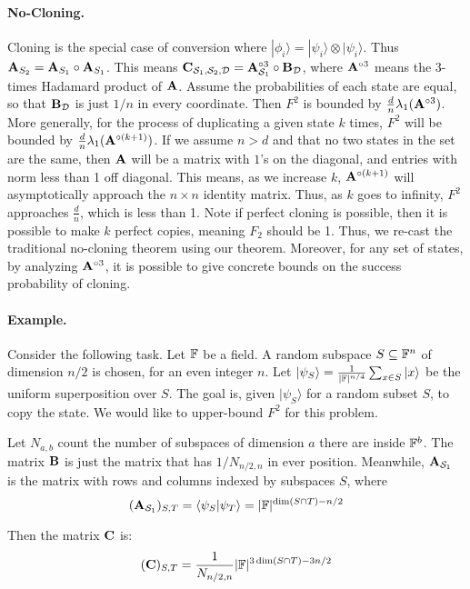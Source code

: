 \paragraph{No-Cloning.} Cloning is the special case of conversion where $|\phi_i\rangle=|\psi_i\rangle\otimes|\psi_i\rangle$.  Thus ${\mathbf{A}}_{S_2}={\mathbf{A}}_{S_1}\circ{\mathbf{A}}_{S_1}$.  This means ${\mathbf{C}}_{{\mathcal{S}}_1,{\mathcal{S}}_2,{\mathcal{D}}}={\mathbf{A}}_{{\mathcal{S}}_1}^{\circ 3}\circ {\mathbf{B}}_{\mathcal{D}}$, where ${\mathbf{A}}^{\circ 3}$ means the 3-times Hadamard product of ${\mathbf{A}}$.  Assume the probabilities of each state are equal, so that ${\mathbf{B}}_{{\mathcal{D}}}$ is just $1/n$ in every coordinate.  Then $F^2$ is bounded by $\frac{d}{n}\lambda_1({\mathbf{A}}^{\circ 3})$.  More generally, for the process of duplicating a given state $k$ times, $F^2$ will be bounded by $\frac{d}{n}\lambda_1({\mathbf{A}}^{\circ (k+1)})$.  If we assume $n>d$ and that no two states in the set are the same, then ${\mathbf{A}}$ will be a matrix with $1$'s on the diagonal, and entries with norm less than 1 off diagonal.  This means, as we increase $k$, ${\mathbf{A}}^{\circ (k+1)}$ will asymptotically approach the $n\times n$ identity matrix.  Thus, as $k$ goes to infinity, $F^2$ approaches $\frac{d}{n}$, which is less than 1.  Note if perfect cloning is possible, then it is possible to make $k$ perfect copies, meaning $F_2$ should be 1.  Thus, we re-cast the traditional no-cloning theorem using our theorem.  Moreover, for any set of states, by analyzing ${\mathbf{A}}^{\circ 3}$, it is possible to give concrete bounds on the success probability of cloning.

\paragraph{Example.} Consider the following task.  Let ${\mathbb F}$ be a field.  A random subspace $S\subseteq {\mathbb F}^n$ of dimension $n/2$ is chosen, for an even integer $n$.  Let $|\psi_S\rangle=\frac{1}{|{\mathbb F}|^{n/4}}\sum_{x\in S}|x\rangle$ be the uniform superposition over $S$.  The goal is, given $|\psi_S\rangle$ for a random subset $S$, to copy the state.  We would like to upper-bound $F^2$ for this problem.  

Let $N_{a,b}$ count the number of subspaces of dimension $a$ there are inside ${\mathbb F}^b$.  The matrix ${\mathbf{B}}$ is just the matrix that has $1/N_{n/2,n}$ in ever position.  Meanwhile, ${\mathbf{A}}_{{\mathcal{S}}_1}$ is the matrix with rows and columns indexed by subspaces $S$, where \[({\mathbf{A}}_{{\mathcal{S}}_1})_{S,T}=\langle\psi_S|\psi_T\rangle=|{\mathbb F}|^{\dim(S\cap T)-n/2}\]

Then the matrix ${\mathbf{C}}$ is:
\[({\mathbf{C}})_{S,T}=\frac{1}{N_{n/2,n}} |{\mathbb F}|^{3\dim(S\cap T)-3n/2}\]

